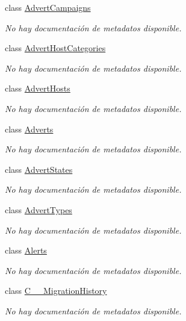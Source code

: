 \begin{DoxyCompactItemize}
class \hyperlink{class_game_memory_1_1_advert_campaigns}{Advert\-Campaigns}
\begin{DoxyCompactList}\small\item\em No hay documentación de metadatos disponible. \end{DoxyCompactList}\item 
class \hyperlink{class_game_memory_1_1_advert_host_categories}{Advert\-Host\-Categories}
\begin{DoxyCompactList}\small\item\em No hay documentación de metadatos disponible. \end{DoxyCompactList}\item 
class \hyperlink{class_game_memory_1_1_advert_hosts}{Advert\-Hosts}
\begin{DoxyCompactList}\small\item\em No hay documentación de metadatos disponible. \end{DoxyCompactList}\item 
class \hyperlink{class_game_memory_1_1_adverts}{Adverts}
\begin{DoxyCompactList}\small\item\em No hay documentación de metadatos disponible. \end{DoxyCompactList}\item 
class \hyperlink{class_game_memory_1_1_advert_states}{Advert\-States}
\begin{DoxyCompactList}\small\item\em No hay documentación de metadatos disponible. \end{DoxyCompactList}\item 
class \hyperlink{class_game_memory_1_1_advert_types}{Advert\-Types}
\begin{DoxyCompactList}\small\item\em No hay documentación de metadatos disponible. \end{DoxyCompactList}\item 
class \hyperlink{class_game_memory_1_1_alerts}{Alerts}
\begin{DoxyCompactList}\small\item\em No hay documentación de metadatos disponible. \end{DoxyCompactList}\item 
class \hyperlink{class_game_memory_1_1_c_____migration_history}{C\-\_\-\-\_\-\-Migration\-History}
\begin{DoxyCompactList}\small\item\em No hay documentación de metadatos disponible. \end{DoxyCompactList}\item 

\end{DoxyCompactItemize}
